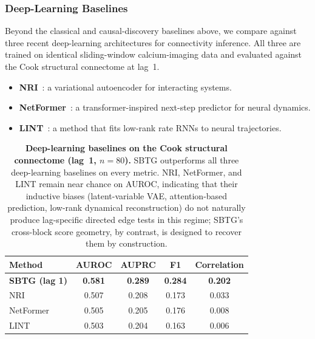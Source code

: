 \documentclass{article}
\theoremstyle{plain}
\theoremstyle{definition}
\theoremstyle{remark}
\newcommand{\1}{\mathbf{1}}
\begin{document}
\subsubsection{Deep-Learning Baselines}
\label{app:dl_baselines}

Beyond the classical and causal-discovery baselines above, we compare against three recent deep-learning architectures for connectivity inference. All three are trained on identical sliding-window calcium-imaging data and evaluated against the Cook structural connectome at lag~1.

\begin{itemize}[leftmargin=1.5em, itemsep=2pt]
  \item \textbf{NRI}~\citep{Kipf2018NRI}: a variational autoencoder for interacting systems.
  \item \textbf{NetFormer}~\citep{Lu2025NetFormer}: a transformer-inspired next-step predictor for neural dynamics. 
  \item \textbf{LINT}~\citep{Valente2022LINT}: a method that fits low-rank rate RNNs to neural trajectories.
\end{itemize}


\begin{table}[h!]
\centering
\caption{\textbf{Deep-learning baselines on the Cook structural connectome (lag~1, $n{=}80$).} SBTG outperforms all three deep-learning baselines on every metric. NRI, NetFormer, and LINT remain near chance on AUROC, indicating that their inductive biases (latent-variable VAE, attention-based prediction, low-rank dynamical reconstruction) do not naturally produce lag-specific directed edge tests in this regime; SBTG's cross-block score geometry, by contrast, is designed to recover them by construction.}
\label{tab:dl_baselines_cook}
\begin{small}
\begin{tabular}{lcccc}
\toprule
Method & AUROC & AUPRC & F1 & Correlation \\
\midrule
\textbf{SBTG (lag 1)} & \textbf{0.581} & \textbf{0.289} & \textbf{0.284} & \textbf{0.202} \\
NRI~\citep{Kipf2018NRI} & 0.507 & 0.208 & 0.173 & 0.033 \\
NetFormer~\citep{Lu2025NetFormer} & 0.505 & 0.205 & 0.176 & 0.008 \\
LINT~\citep{Valente2022LINT} & 0.503 & 0.204 & 0.163 & 0.006 \\
\bottomrule
\end{tabular}
\end{small}
\end{table}
\end{document}

